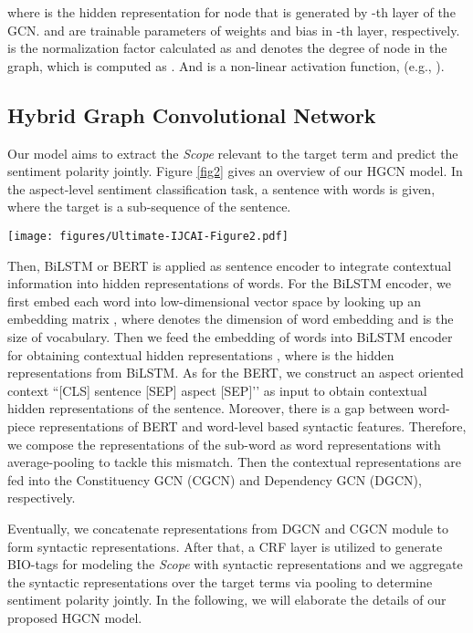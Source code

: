 \documentclass{article}
\begin{document}
where  is the hidden representation for node  that is generated by -th layer of the GCN.  and  are trainable parameters of weights and bias in -th layer, respectively.  is the normalization factor calculated as  and  denotes the degree of node  in the graph, which is computed as . And  is a non-linear activation function, (e.g.,  \cite{glorot2011deep}).

\subsection{Hybrid Graph Convolutional Network}

Our model aims to extract the \emph{Scope} relevant to the target term and predict the sentiment polarity jointly. Figure \ref{fig2} gives an overview of our HGCN model. In the aspect-level sentiment classification task, a sentence with  words  is given, where the target  is a sub-sequence of the sentence.

\begin{figure*}[t]
	\centering
	\texttt{[image: figures/Ultimate-IJCAI-Figure2.pdf]} 
	\caption{Overview of hybrid graph convolutional network (HGCN).}
	\label{fig2}
\end{figure*}

Then, BiLSTM \cite{graves2013speech} or BERT \cite{devlin2019bert} is applied as sentence encoder to integrate contextual information into hidden representations of words. For the BiLSTM encoder, we first embed each word into low-dimensional vector space by looking up an embedding matrix , where  denotes the dimension of word embedding and  is the size of vocabulary. Then we feed the embedding of words into BiLSTM encoder for obtaining contextual hidden representations , where  is the hidden representations from BiLSTM. As for the BERT, we construct an aspect oriented context ``[CLS] sentence [SEP] aspect [SEP]’’ as input to obtain contextual hidden representations of the sentence. Moreover, there is a gap between word-piece representations of BERT and word-level based syntactic features. Therefore, we compose the representations of the sub-word as word representations with average-pooling to tackle this mismatch. Then the contextual representations are fed into the Constituency GCN (CGCN) and Dependency GCN (DGCN), respectively. 

Eventually, we concatenate representations from DGCN and CGCN module to form syntactic representations. After that, a CRF layer is utilized to generate BIO-tags for modeling the \emph{Scope} with syntactic representations and we aggregate the syntactic representations over the target terms via pooling to determine sentiment polarity jointly. In the following, we will elaborate the details of our proposed HGCN model.
\end{document}
